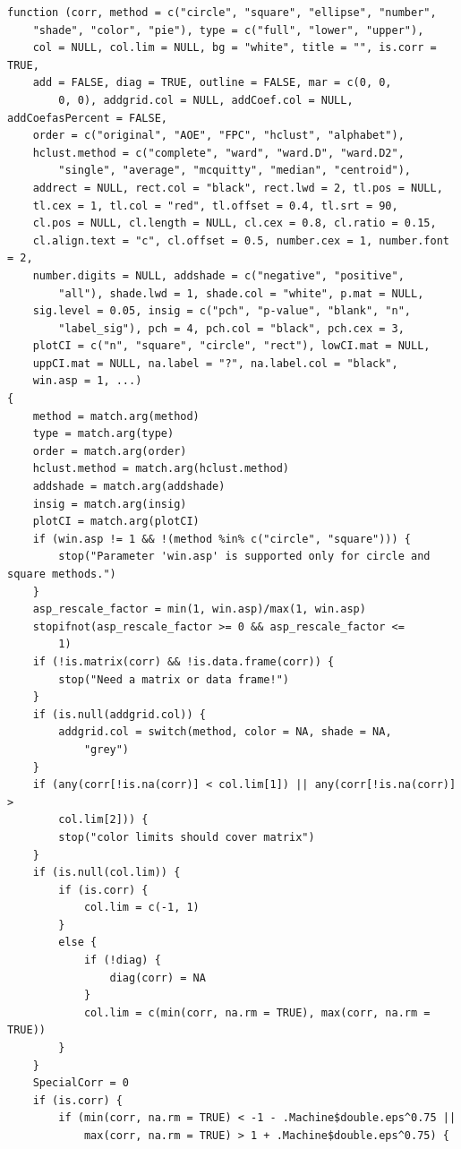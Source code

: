 \documentclass[
]{article}
\begin{document}
\begin{verbatim}
function (corr, method = c("circle", "square", "ellipse", "number", 
    "shade", "color", "pie"), type = c("full", "lower", "upper"), 
    col = NULL, col.lim = NULL, bg = "white", title = "", is.corr = TRUE, 
    add = FALSE, diag = TRUE, outline = FALSE, mar = c(0, 0, 
        0, 0), addgrid.col = NULL, addCoef.col = NULL, addCoefasPercent = FALSE, 
    order = c("original", "AOE", "FPC", "hclust", "alphabet"), 
    hclust.method = c("complete", "ward", "ward.D", "ward.D2", 
        "single", "average", "mcquitty", "median", "centroid"), 
    addrect = NULL, rect.col = "black", rect.lwd = 2, tl.pos = NULL, 
    tl.cex = 1, tl.col = "red", tl.offset = 0.4, tl.srt = 90, 
    cl.pos = NULL, cl.length = NULL, cl.cex = 0.8, cl.ratio = 0.15, 
    cl.align.text = "c", cl.offset = 0.5, number.cex = 1, number.font = 2, 
    number.digits = NULL, addshade = c("negative", "positive", 
        "all"), shade.lwd = 1, shade.col = "white", p.mat = NULL, 
    sig.level = 0.05, insig = c("pch", "p-value", "blank", "n", 
        "label_sig"), pch = 4, pch.col = "black", pch.cex = 3, 
    plotCI = c("n", "square", "circle", "rect"), lowCI.mat = NULL, 
    uppCI.mat = NULL, na.label = "?", na.label.col = "black", 
    win.asp = 1, ...) 
{
    method = match.arg(method)
    type = match.arg(type)
    order = match.arg(order)
    hclust.method = match.arg(hclust.method)
    addshade = match.arg(addshade)
    insig = match.arg(insig)
    plotCI = match.arg(plotCI)
    if (win.asp != 1 && !(method %in% c("circle", "square"))) {
        stop("Parameter 'win.asp' is supported only for circle and square methods.")
    }
    asp_rescale_factor = min(1, win.asp)/max(1, win.asp)
    stopifnot(asp_rescale_factor >= 0 && asp_rescale_factor <= 
        1)
    if (!is.matrix(corr) && !is.data.frame(corr)) {
        stop("Need a matrix or data frame!")
    }
    if (is.null(addgrid.col)) {
        addgrid.col = switch(method, color = NA, shade = NA, 
            "grey")
    }
    if (any(corr[!is.na(corr)] < col.lim[1]) || any(corr[!is.na(corr)] > 
        col.lim[2])) {
        stop("color limits should cover matrix")
    }
    if (is.null(col.lim)) {
        if (is.corr) {
            col.lim = c(-1, 1)
        }
        else {
            if (!diag) {
                diag(corr) = NA
            }
            col.lim = c(min(corr, na.rm = TRUE), max(corr, na.rm = TRUE))
        }
    }
    SpecialCorr = 0
    if (is.corr) {
        if (min(corr, na.rm = TRUE) < -1 - .Machine$double.eps^0.75 || 
            max(corr, na.rm = TRUE) > 1 + .Machine$double.eps^0.75) {

\end{verbatim}
\end{document}

